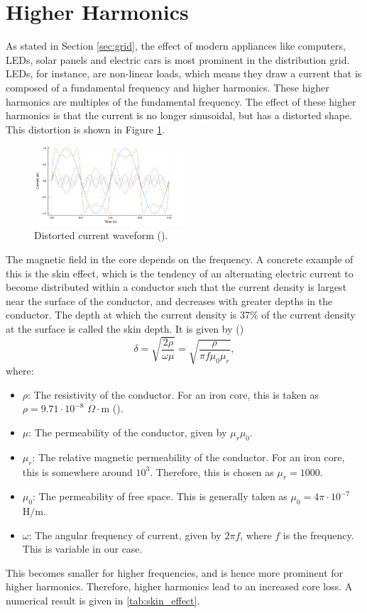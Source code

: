 \section{Higher Harmonics}
As stated in Section \ref{sec:grid}, the effect of modern appliances like computers, LEDs, solar panels and electric cars is most prominent in the distribution grid.
LEDs, for instance, are non-linear loads, which means they draw a current that is composed of a fundamental frequency and higher harmonics.
These higher harmonics are multiples of the fundamental frequency. The effect of these higher harmonics is that the current is no longer sinusoidal, but has a distorted shape.
This distortion is shown in Figure \ref{fig:higherharmonics}.
\begin{figure}[H]
    \centering
    \includegraphics[width=0.5\textwidth]{img/higher_harmonics.png}
    \caption{Distorted current waveform (\cite{vanDijk2022}).}
    \label{fig:higherharmonics}
\end{figure}
The magnetic field in the core depends on the frequency. A concrete example of this is the skin effect, which is the tendency of an alternating electric current to become distributed within a conductor such that the current density is largest near the surface of the conductor, and decreases with greater depths in the conductor. The depth at which the current density is 37\% of the current density at the surface is called the skin depth. It is given by (\cite{skinEffect})
\begin{equation}
    \delta = \sqrt{\frac{2 \rho}{\omega \mu}} = \sqrt{\frac{\rho}{\pi f \mu_0 \mu_r}},
\end{equation}
where:
\begin{itemize}
    \item $\rho$: The resistivity of the conductor. For an iron core, this is taken as $\rho = 9.71 \cdot 10^{-8}$ $\Omega \! \cdot \! \text{m}$ (\cite{restitivity}).
    \item $\mu$: The permeability of the conductor, given by $\mu_r \mu_0$.
    \item $\mu_r$: The relative magnetic permeability of the conductor. For an iron core, this is somewhere around $10^3$. Therefore, this is chosen as $\mu_r = 1000$.
    \item $\mu_0$: The permeability of free space. This is generally taken as $\mu_0 = 4 \pi \cdot 10^{-7}$ $\text{H/m}$.
    \item $\omega$: The angular frequency of current, given by $2 \pi f$, where $f$ is the frequency. This is variable in our case.
\end{itemize}
This becomes smaller for higher frequencies, and is hence more prominent for higher harmonics. Therefore, higher harmonics lead to an increased core loss. A numerical result is given in \cref{tab:skin_effect}.

